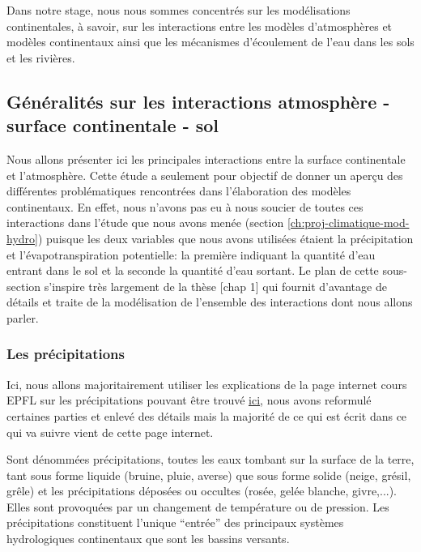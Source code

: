 \documentclass[a4paper,11pt]{article}
\numberwithin{equation}{section}
\begin{document}
Dans notre stage, nous nous sommes concentrés sur les modélisations continentales, à savoir, sur les interactions entre les modèles d'atmosphères et modèles continentaux ainsi que les mécanismes d'écoulement de l'eau dans les sols et les rivières. 

\subsection{Généralités sur les interactions atmosphère - surface continentale - sol}
\label{ch:generalite interaction atmosphere-surface continentale-sol}
Nous allons présenter ici les principales interactions entre la surface continentale et l'atmosphère. Cette étude a seulement pour objectif de donner un aperçu des différentes problématiques rencontrées dans l'élaboration des modèles continentaux. En effet, nous n'avons pas eu à nous soucier de toutes ces interactions dans l'étude que nous avons menée (section \ref{ch:proj-climatique-mod-hydro}) puisque les deux variables que nous avons utilisées étaient la précipitation et l'évapotranspiration potentielle: la première indiquant la quantité d'eau entrant dans le sol et la seconde la quantité d'eau sortant. Le plan de cette sous-section s'inspire très largement de la thèse \cite{maquin2016developpement}[chap 1] qui fournit d'avantage de détails et traite de la modélisation de l'ensemble des interactions dont nous allons parler.

\subsubsection{Les précipitations}
\label{ch:precipitations}

Ici, nous allons majoritairement utiliser les explications de la page internet cours EPFL sur les précipitations pouvant être trouvé \href{https://echo2.epfl.ch/e-drologie/chapitres/chapitre3/chapitre3.html}{\underline{ici}}, nous avons reformulé certaines parties et enlevé des détails mais la majorité de ce qui est écrit dans ce qui va suivre vient de cette page internet.
 
Sont dénommées précipitations, toutes les eaux tombant sur la surface de la terre, tant sous forme liquide (bruine, pluie, averse) que sous forme solide (neige, grésil, grêle) et les précipitations déposées ou occultes (rosée, gelée blanche, givre,...). Elles sont provoquées par un changement de température ou de pression. Les précipitations constituent l'unique ``entrée'' des principaux systèmes hydrologiques continentaux que sont les bassins versants. 
\end{document}
